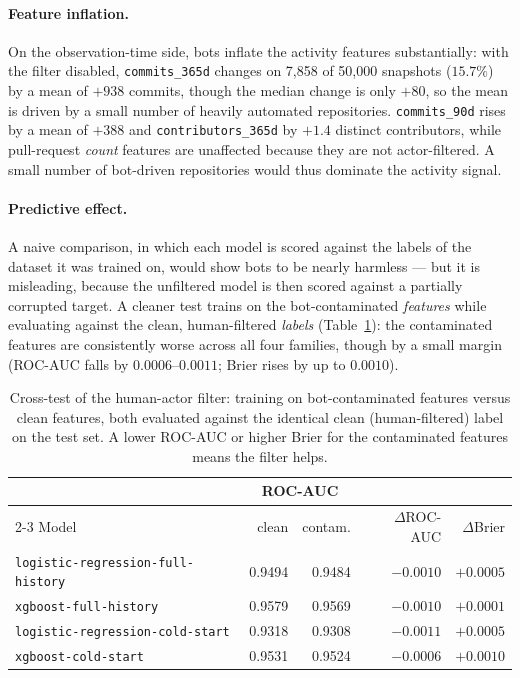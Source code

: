 \paragraph{Feature inflation.} On the observation-time side, bots inflate the activity features substantially: with the filter disabled, \texttt{commits\_365d} changes on 7{,}858 of 50{,}000 snapshots (\(15.7\%\)) by a mean of \(+938\) commits, though the median change is only \(+80\), so the mean is driven by a small number of heavily automated repositories. \texttt{commits\_90d} rises by a mean of \(+388\) and \texttt{contributors\_365d} by \(+1.4\) distinct contributors, while pull-request \emph{count} features are unaffected because they are not actor-filtered. A small number of bot-driven repositories would thus dominate the activity signal.

\paragraph{Predictive effect.} A naive comparison, in which each model is scored against the labels of the dataset it was trained on, would show bots to be nearly harmless --- but it is misleading, because the unfiltered model is then scored against a partially corrupted target. A cleaner test trains on the bot-contaminated \emph{features} while evaluating against the clean, human-filtered \emph{labels} (Table~\ref{tab:bot-ablation-crosstest}): the contaminated features are consistently worse across all four families, though by a small margin (ROC-AUC falls by \(0.0006\)--\(0.0011\); Brier rises by up to \(0.0010\)).

\begin{table}[htbp]
  \centering
  \caption{Cross-test of the human-actor filter: training on bot-contaminated
  features versus clean features, both evaluated against the identical clean
  (human-filtered) label on the test set. A lower ROC-AUC or higher Brier
  for the contaminated features means the filter helps.}
  \label{tab:bot-ablation-crosstest}
  \small
  \setlength{\tabcolsep}{5pt}
  \begin{tabular}{lrrrr}
    \toprule
    & \multicolumn{2}{c}{ROC-AUC} & & \\
    \cmidrule(lr){2-3}
    Model & clean & contam. & \(\Delta\)ROC-AUC & \(\Delta\)Brier \\
    \midrule
    \texttt{logistic-regression-full-history} & 0.9494 & 0.9484 & \(-0.0010\) & \(+0.0005\) \\
    \texttt{xgboost-full-history}             & 0.9579 & 0.9569 & \(-0.0010\) & \(+0.0001\) \\
    \texttt{logistic-regression-cold-start}   & 0.9318 & 0.9308 & \(-0.0011\) & \(+0.0005\) \\
    \texttt{xgboost-cold-start}               & 0.9531 & 0.9524 & \(-0.0006\) & \(+0.0010\) \\
    \bottomrule
  \end{tabular}
\end{table}
